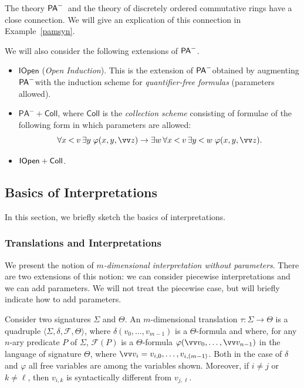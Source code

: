 \documentclass{amsart}
\renewcommand{\phi}{\varphi}
\renewcommand{\Theta}{\varTheta}
\newcommand{\tupel}[1]{{\langle #1 \rangle}}
\newcommand{\bles}{\mathbin{<}}
\newcommand{\pam}{\ensuremath{{\sf PA}^{-}}}
\begin{document}
The theory \pam\ and the theory of discretely ordered commutative rings have a close connection. We will give an explication of this connection in
Example~\ref{pamsyn}.

We will also consider the following extensions of \pam.
\begin{itemize}
    \item $\mathsf{IOpen}$ (\emph{Open Induction}). This is the extension of \pam obtained by augmenting \pam with the induction scheme for \emph{quantifier-free formulas} (parameters allowed).
    \item $\mathsf{PA}^{-} + \mathsf{Coll}$, where $\mathsf{Coll}$ is the \emph{collection scheme} consisting of formulae of the 
    following form in which parameters are allowed:\[\forall x \bles v\, \exists y\; \phi(x,y,\vv z) \to 
    \exists w \, \forall x\bles v\, \exists y\bles w\; \phi(x,y,\vv z).\]
    \item 
    $\mathsf{IOpen} + {\sf Coll}$.
\end{itemize}

\subsection{Basics of Interpretations}\label{interpretations}

In this section, we briefly sketch the basics of interpretations. 

\subsubsection{Translations and Interpretations}
We present the notion of \emph{$m$-dimensi\-onal interpretation without parameters}.
There are two extensions of this notion: we can  consider piecewise interpretations
and we can add parameters. We will not treat the piecewise case, but will briefly indicate how to
add parameters.

Consider two signatures $\Sigma$ and $\Theta$. An $m$-dimensional translation $\tau:\Sigma \to \Theta$
is a quadruple $\tupel{\Sigma,\delta,\mathcal F,\Theta}$, where $\delta(v_0,\ldots,v_{m-1})$ is a $\Theta$-formula and where,
for any $n$-ary predicate $P$ of $\Sigma$, $\mathcal F(P)$ is a $\Theta$-formula $\phi(\vv v_{0},\ldots, \vv v_{n-1})$ in the language
of signature $\Theta$, where
$\vv v_i = v_{i,0},\ldots, v_{i,(m-1)}$.
Both in the case of $\delta$ and $\phi$ all free variables are among the variables shown.
Moreover, if $i\neq j$ or $k \neq\ell$, then $v_{i,k}$ is syntactically different from $v_{j,\ell}$.
\end{document}
